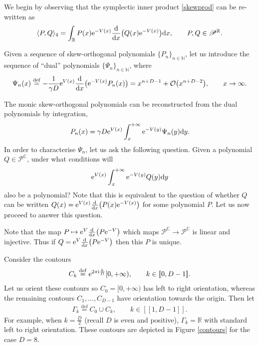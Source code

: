 We begin by observing that the symplectic inner product \eqref{skewprod} can be re-written as
\[
\langle P, Q \rangle_4 = \int_{\mathbb{R}} P(x) {\rm e}^{-V(x)} \frac{\rm d}{{\rm d}x}\big( Q(x) {\rm e}^{-V(x)} \big) {\rm d}x,\qquad P,Q \in \mathscr{P}^\mathbb{R}.
\]
\begin{Definition}
Given a sequence of skew-orthogonal polynomials $\{ P_n \}_{n \in \mathbb{N}}$, let us introduce the sequence of \enquote{dual} polynomials $\{ \Psi_n \}_{n \in \mathbb{N}}$, where
\[%
\Psi_n(x) \overset{\mathrm{def}}{=} -\frac{1}{\gamma D} {\rm e}^{V(x)}\frac{\rm d}{{\rm d}x}\big( {\rm e}^{-V(x)} P_n(x) \big) = x^{n+D-1} + \mathcal{O}\big(x^{n+D-2}\big),\qquad x \to \infty.
\]
\end{Definition}
The monic skew-orthogonal polynomials can be reconstructed from the dual polynomials by integration,
\[
P_n(x) = \gamma D {\rm e}^{V(x)} \int_{x}^{+\infty} {\rm e}^{-V(y)} \Psi_n(y) {\rm d}y.
\]
In order to characterise $\Psi_n$, let us ask the following question. Given a polynomial $Q \in \mathscr{P}^\mathbb{C}$, under what conditions will
\begin{equation*}
{\rm e}^{V(x)} \int_{x}^{+\infty} {\rm e}^{-V(y)} Q(y) {\rm d}y
\end{equation*}
also be a polynomial? Note that this is equivalent to the question of whether $Q$ can be written $Q(x) = {\rm e}^{V(x)} \frac{\rm d}{{\rm d}x} \big( P(x) {\rm e}^{-V(x)} \big)$ for some polynomial $P$. Let us now proceed to answer this question.

\begin{Remark}\label{polyunique} Note that the map $P \mapsto {\rm e}^V \frac{\rm d}{{\rm d}x}\big(P {\rm e}^{-V}\big)$ which maps $\mathscr{P}^\mathbb{C}\to \mathscr{P}^\mathbb{C}$ is linear and injective. Thus if $Q = {\rm e}^V \frac{\rm d}{{\rm d}x}\big(P {\rm e}^{-V}\big)$ then this $P$ is unique.
\end{Remark}

Consider the contours
\begin{align}\label{contour1}
C_k \overset{\mathrm{def}}{=} {\rm e}^{2\pi {\rm i}\frac{k}{D}} [0,+\infty),\qquad k \in [\![ 0,D-1]\!].
\end{align}
Let us orient these contours so $C_0=[0,+\infty)$ has left to right orientation, whereas the remaining contours $C_1, \dots, C_{D-1}$ have orientation towards the origin. Then let
\begin{align}\label{contour2}
\Gamma_k \overset{\mathrm{def}}{=} C_0 \cup C_k,\qquad k \in [\![ 1,D-1]\!].
\end{align}
For example, when $k=\frac{D}{2}$ (recall $D$ is even and positive), $\Gamma_k = \mathbb{R}$ with standard left to right orientation. These contours are depicted in Figure \ref{contours} for the case $D=8$.

